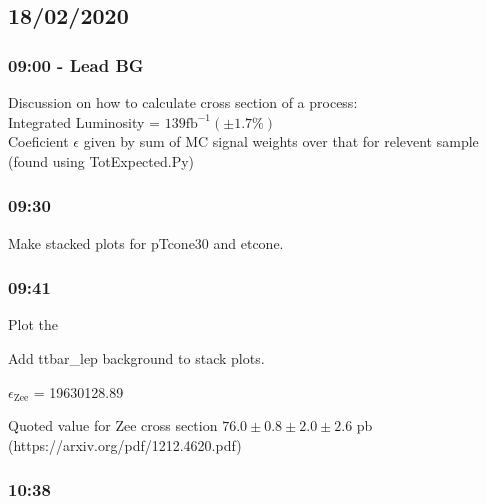 
\subsection*{\textbf{18/02/2020}}
\subsubsection*{09:00 - Lead BG}
Discussion on how to calculate cross section of a process:
\\
Integrated Luminosity = $139 \text{fb}^{-1} (\pm 1.7\%)$
\\
Coeficient $\epsilon$ given by sum of MC signal weights over that for relevent sample (found using TotExpected.Py)

\subsubsection*{09:30}
Make stacked plots for pTcone30 and etcone.

\subsubsection*{09:41}
Plot the





Add ttbar\_lep background to stack plots.


$\epsilon_{\text{Zee}}$ = 19630128.89

Quoted value for Zee cross section $76.0 \pm 0.8 \pm 2.0 \pm 2.6$ pb (https://arxiv.org/pdf/1212.4620.pdf)

\subsubsection*{10:38}

